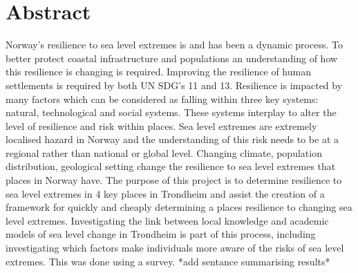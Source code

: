 

\section{Abstract}

Norway’s resilience to sea level extremes is and has been a dynamic process. To better protect coastal infrastructure and populations an understanding of how this resilience is changing is required. Improving the resilience of human settlements is required by both UN SDG's 11 and 13. Resilience is impacted by many factors which can be considered as falling within three key systems:  natural, technological and social systems. These systems interplay to alter the level of resilience and risk within places. Sea level extremes are extremely localised hazard in Norway and the understanding of this risk needs to be at a regional rather than national or global level. Changing climate, population distribution, geological setting change the resilience to sea level extremes that places in Norway have. 
The purpose of this project is to determine resilience to sea level extremes in 4 key places in Trondheim and assist the creation of a framework for quickly and cheaply determining a places resilience to changing sea level extremes. Investigating the link between local knowledge and academic models of sea level change in Trondheim is part of this process, including investigating which factors make individuals more aware of the risks of sea level extremes. This was done using a survey. *add sentance summarising results*



